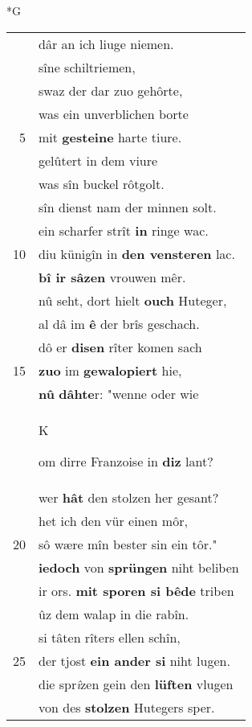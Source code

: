 \documentclass[8pt,a4paper,notitlepage]{article}
\begin{document}
\newpage
\begin{table}[ht]
\begin{minipage}[t]{0.5\linewidth}
\small
\begin{center}*G
\end{center}
\begin{tabular}{rl}
 & dâr an ich liuge niemen.\\ 
 & sîne schiltriemen,\\ 
 & swaz der dar zuo gehôrte,\\ 
 & was ein unverblichen borte\\ 
5 & mit \textbf{gesteine} harte tiure.\\ 
 & gelûtert in dem viure\\ 
 & was sîn buckel rôtgolt.\\ 
 & sîn dienst nam der minnen solt.\\ 
 & ein scharfer strît \textbf{in} ringe wac.\\ 
10 & diu künigîn in \textbf{den vensteren} lac.\\ 
 & \textbf{bî ir sâzen} vrouwen mêr.\\ 
 & nû seht, dort hielt \textbf{ouch} Huteger,\\ 
 & al dâ im \textbf{ê} der brîs geschach.\\ 
 & dô er \textbf{disen} rîter komen sach\\ 
15 & \textbf{zuo} im \textbf{gewalopiert} hie,\\ 
 & \textbf{nû} \textbf{dâhte}r: "wenne oder wie\\ 
 & \begin{large}K\end{large}om dirre Franzoise in \textbf{diz} lant?\\ 
 & wer \textbf{hât} den stolzen her gesant?\\ 
 & het ich den vür einen môr,\\ 
20 & sô wære mîn bester sin ein tôr."\\ 
 & \textbf{iedoch} von \textbf{sprüngen} niht beliben\\ 
 & ir ors. \textbf{mit sporen si bêde} triben\\ 
 & ûz dem walap in die rabîn.\\ 
 & si tâten rîters ellen schîn,\\ 
25 & der tjost \textbf{ein ander si} niht lugen.\\ 
 & die spr\textit{î}zen gein den \textbf{lüften} vlugen\\ 
 & von des \textbf{stolzen} Hutegers sper.\\ 

\end{tabular}
\end{minipage}
\end{table}
\end{document}
